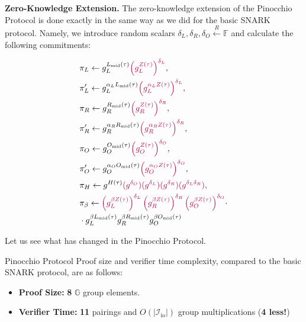 \documentclass[../lecture-notes.tex]{subfiles}
\begin{document}
\textcolor{blue!75!gray}{\textbf{Zero-Knowledge Extension.}} The zero-knowledge extension of the Pinocchio Protocol is done exactly in the same way as we did for the basic SNARK protocol. Namely, we introduce random scalars $\delta_L, \delta_R, \delta_O \xleftarrow{R} \mathbb{F}$ and calculate the following commitments:
\begin{center}    
    \begin{equation*}
        \begin{aligned}    
            &\pi_L \gets g_L^{L_{\text{mid}}(\tau)}\textcolor{purple}{\left(g_L^{Z(\tau)}\right)^{\delta_L}}, \\ 
            &\pi_L' \gets g_L^{\alpha_LL_{\text{mid}}(\tau)}\textcolor{purple}{\left(g_L^{\alpha_L Z(\tau)}\right)^{\delta_L}}, \\
            &\pi_R \gets g_R^{R_{\text{mid}}(\tau)}\textcolor{purple}{\left(g_R^{Z(\tau)}\right)^{\delta_R}}, \\ 
            &\pi_R' \gets g_R^{\alpha_RR_{\text{mid}}(\tau)}\textcolor{purple}{\left(g_R^{\alpha_R Z(\tau)}\right)^{\delta_R}}, \\
            &\pi_O \gets g_O^{O_{\text{mid}}(\tau)}\textcolor{purple}{\left(g_O^{Z(\tau)}\right)^{\delta_O}}, \\
            &\pi_O' \gets g_O^{\alpha_OO_{\text{mid}}(\tau)}\textcolor{purple}{\left(g_O^{\alpha_O Z(\tau)}\right)^{\delta_O}}, \\
            &\pi_H \gets g^{H(\tau)}\textcolor{purple}{(g^{\delta_O})(g^{\delta_L})(g^{\delta_R})(g^{\delta_L\delta_R})}, \\ 
            &\pi_{\beta} \gets \textcolor{purple}{\left(g_L^{\beta Z(\tau)}\right)^{\delta_L}\left(g_R^{\beta Z(\tau)}\right)^{\delta_R}\left(g_O^{\beta Z(\tau)}\right)^{\delta_O}} \cdot \\ &  \cdot g_L^{\beta L_{\text{mid}}(\tau)}g_R^{\beta R_{\text{mid}}(\tau)}g_O^{\beta O_{\text{mid}}(\tau)}
        \end{aligned}
    \end{equation*}
\end{center}

Let us see what has changed in the Pinocchio Protocol.

\begin{proposition}{Pinocchio Protocol}
    Proof size and verifier time complexity, compared to the basic SNARK protocol, are as follows:
    \begin{itemize}
        \item \textbf{Proof Size:} \textbf{8} $\mathbb{G}$ group elements.
        \item \textbf{Verifier Time:} \textbf{11} pairings and $O(|\mathcal{I}_{\text{io}}|)$ group multiplications (\textbf{4 less!})
    \end{itemize}
\end{proposition}
\end{document}
